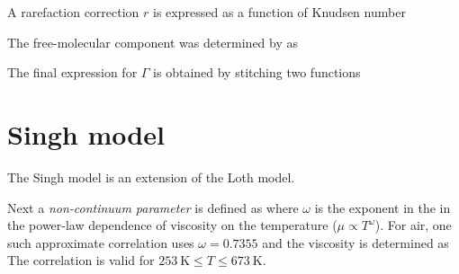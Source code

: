 
    A rarefaction correction $r$ is expressed as a function of Knudsen number


    The free-molecular component was determined by \citet{patterson1971} as

    The final expression for $\Gamma$ is obtained by stitching two functions

\section{Singh model} \label{DS}
    The Singh model \citep{singh+2020} is an extension of the Loth model.

    Next a \emph{non-continuum parameter} is defined as
    where $\omega$ is the exponent in the in the power-law dependence of viscosity
    on the temperature ($\mu \propto T^\omega$).
    For air, one such approximate correlation \citep{tec-science-viscosity} uses $\omega = \num{0.7355}$
    and the viscosity is determined as
    The correlation is valid for $\SI{253}{\kelvin} \leq T \leq \SI{673}{\kelvin}$.

